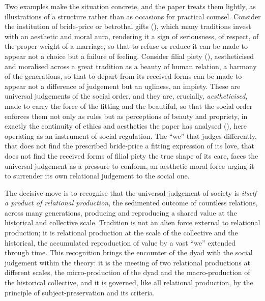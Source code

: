 Two examples make the situation concrete, and the paper treats them lightly, as illustrations of a structure rather than as occasions for practical counsel. Consider the institution of bride-price or betrothal gifts (), which many traditions invest with an aesthetic and moral aura, rendering it a sign of seriousness, of respect, of the proper weight of a marriage, so that to refuse or reduce it can be made to appear not a choice but a failure of feeling. Consider filial piety (), aestheticised and moralised across a great tradition as a beauty of human relation, a harmony of the generations, so that to depart from its received forms can be made to appear not a difference of judgement but an ugliness, an impiety. These are universal judgements of the social order, and they are, crucially, \emph{aestheticised}, made to carry the force of the fitting and the beautiful, so that the social order enforces them not only as rules but as perceptions of beauty and propriety, in exactly the continuity of ethics and aesthetics the paper has analysed (), here operating as an instrument of social regulation. The ``we'' that judges differently, that does not find the prescribed bride-price a fitting expression of its love, that does not find the received forms of filial piety the true shape of its care, faces the universal judgement as a pressure to conform, an aesthetic-moral force urging it to surrender its own relational judgement to the social one.

The decisive move is to recognise that the universal judgement of society is \emph{itself a product of relational production}, the sedimented outcome of countless relations, across many generations, producing and reproducing a shared value at the historical and collective scale. Tradition is not an alien force external to relational production; it is relational production at the scale of the collective and the historical, the accumulated reproduction of value by a vast ``we'' extended through time. This recognition brings the encounter of the dyad with the social judgement within the theory: it is the meeting of two relational productions at different scales, the micro-production of the dyad and the macro-production of the historical collective, and it is governed, like all relational production, by the principle of subject-preservation and its criteria.

